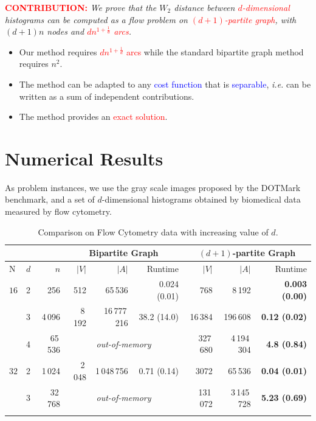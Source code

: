 \documentclass[al, 27pt, plainboxedsections, landscape]{sciposter}
\newcommand{\tb}[1]{\textcolor{blue}{#1}}
\newcommand{\tre}[1]{\textcolor{red}{#1}}
\begin{document}
\begin{multicols}{3}
{\large \tre{{\bf CONTRIBUTION:}}
\textit{
We prove that 
 the $W_2$ distance
between \tre{$d$-dimensional}  histograms can 
be computed as a flow problem 
on   \tre{$(d+1)$-partite graph},  with   $(d+1)n$ nodes
  and  \tre{$dn^{1+\frac{1}{d}}$ arcs}. }}



\begin{itemize}
	\item Our method requires  \tre{$dn^{1+\frac{1}{d}}$ arcs} while the standard bipartite graph method requires $n^2$.
	\item The method can be adapted  to any \tb{cost function} that is \tb{separable}, \emph{i.e.} can be written as a sum of independent contributions.
	\item  The method provides an \tre{exact solution}. 
\end{itemize}

\section{Numerical Results}
As problem instances, we use the gray scale images proposed by
the DOTMark benchmark, and a set of $d$-dimensional histograms obtained by biomedical data
measured by flow cytometry.

\begin{table}
\caption{Comparison on Flow Cytometry data with increasing value of $d$.}
	\label{tab:3}
\centering
{\renewcommand{\arraystretch}{1.2}
\begin{tabular}{l@{\hskip 0.4in}l@{\hskip 0.4in}r@{\hskip 0.4in}rrr@{\hskip 0.4in}rr@{\hskip 0.4in}r}
     \multicolumn{3}{c}{} & \multicolumn{3}{c}{Bipartite Graph} & \multicolumn{3}{c}{$(d+1)$-partite Graph} \\
	 \hline
N & $d$ & $n$ & $|V|$ & $|A|$ & Runtime & $|V|$ & $|A|$ & Runtime  \\
\hline
$16$ & 2 & 256 & 512 & 65\,536 & 0.024 (0.01) & 768 & 8\,192 & {\bf 0.003 (0.00)} \\
& 3 & 4\,096 & 8\,192 & 16\,777\,216& 38.2 (14.0)   & 16\,384 & 196\,608& {\bf 0.12 (0.02)}  \\
& 4 & 65\,536 & \multicolumn{3}{c}{{\it out-of-memory}} & 327\,680 & 4\,194\,304& {\bf 4.8 (0.84)} \\
 \hline\noalign{\smallskip}
$32$ & 2 & 1\,024 & 2\,048 & 1\,048\,756 & 0.71 (0.14) & 3072 & 65\,536& {\bf 0.04 (0.01)} \\
& 3 & 32\,768& \multicolumn{3}{c}{{\it out-of-memory}}   & 131\,072 & 3\,145\,728& {\bf 5.23 (0.69)}  \\
 \hline\noalign{\smallskip}
 \end{tabular}}
\end{table}


\end{multicols}
\end{document}
